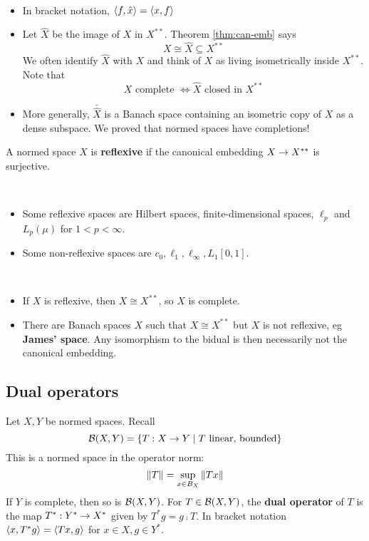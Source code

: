 \documentclass{article}
\begin{document}
\begin{rmks}~
  \begin{itemize}
    \item In bracket notation, $\left\langle f, \hat x\right\rangle = \left\langle x, f\right\rangle$
    \item Let $\hat X$ be the image of $X$ in $X^{**}$. Theorem \ref{thm:can-emb} says
      $$X \cong \hat X \subseteq X^{**}$$
      We often identify $\hat X$ with $X$ and think of $X$ as living isometrically inside $X^{**}$. Note that
      $$X \text{ complete } \iff \hat X \text{ closed in } X^{**}$$
    \item More generally, $\bar{\hat X}$ is a Banach space containing an isometric copy of $X$ as a dense subspace. We proved that normed spaces have completions!
  \end{itemize}
\end{rmks}

\begin{defi}
  A normed space $X$ is {\bf reflexive} if the canonical embedding $X \rightarrow X^{**}$ is surjective.
\end{defi}

\begin{egs}~
  \begin{itemize}
    \item Some reflexive spaces are Hilbert spaces, finite-dimensional spaces, $\ell_p$ and $L_p(\mu)$ for $1 < p < \infty$.
    \item Some non-reflexive spaces are $c_0, \ell_1, \ell_\infty, L_1[0, 1]$.
  \end{itemize}
\end{egs}

\begin{rmks}~
  \begin{itemize}
  \item If $X$ is reflexive, then $X \cong X^{**}$, so $X$ is complete.
  \item There are Banach spaces $X$ such that $X \cong X^{**}$ but $X$ is not reflexive, eg {\bf James' space}. Any isomorphism to the bidual is then necessarily not the canonical embedding.
  \end{itemize}
\end{rmks}

\subsection{Dual operators}

\newlec

Let $X, Y$ be normed spaces. Recall
$$\mathcal B(X, Y) = \{T : X \rightarrow Y \mid T \text{ linear, bounded}\}$$
This is a normed space in the operator norm:
$$\left\lVert T\right\rVert = \sup_{x \in B_X} \left\lVert Tx\right\rVert$$
If $Y$ is complete, then so is $\mathcal B(X, Y)$. For $T \in \mathcal B(X, Y)$, the {\bf dual operator} of $T$ is the map $T^* : Y^* \rightarrow X^*$ given by $T^*g = g \comp T$. In bracket notation $\left\langle x, T^*g\right\rangle = \left\langle Tx, g\right\rangle$ for $x \in X, g \in Y^*$.
\end{document}
